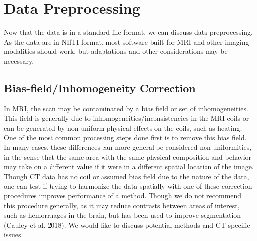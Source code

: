 \documentclass[]{elsarticle} %
\begin{document}
\hypertarget{data-preprocessing}{%
\section{Data Preprocessing}\label{data-preprocessing}}

Now that the data is in a standard file format, we can discuss data preprocessing. As the data are in NIfTI format, most software built for MRI and other imaging modalities should work, but adaptations and other considerations may be necessary.

\hypertarget{bias-fieldinhomogeneity-correction}{%
\subsection{Bias-field/Inhomogeneity Correction}\label{bias-fieldinhomogeneity-correction}}

In MRI, the scan may be contaminated by a bias field or set of inhomogeneities. This field is generally due to inhomogeneities/inconsistencies in the MRI coils or can be generated by non-uniform physical effects on the coils, such as heating. One of the most common processing steps done first is to remove this bias field. In many cases, these differences can more general be considered non-uniformities, in the sense that the same area with the same physical composition and behavior may take on a different value if it were in a different spatial location of the image. Though CT data has no coil or assumed bias field due to the nature of the data, one can test if trying to harmonize the data spatially with one of these correction procedures improves performance of a method. Though we do not recommend this procedure generally, as it may reduce contrasts between areas of interest, such as hemorrhages in the brain, but has been used to improve segmentation (Cauley et al. 2018). We would like to discuss potential methods and CT-specific issues.
\end{document}
